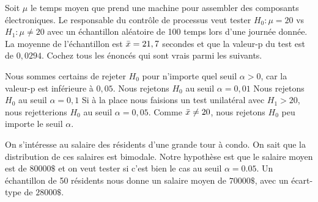 \begin{questions}
\newpage
\question[4]
Soit $\mu$ le temps moyen que prend une machine pour assembler des composants électroniques. Le responsable du contrôle de processus veut tester $H_0:\mu=20$ vs $H_1:\mu\neq 20$ avec un échantillon aléatoire de 100 temps lors d'une journée donnée. La moyenne de l'échantillon est $\Bar{x}=21,7$ secondes et que la valeur-p du test est de $0,0294$. Cochez tous les énoncés qui sont vrais parmi les suivants.
\begin{checkboxes}
\choice Nous sommes certains de rejeter $H_0$ pour n'importe quel seuil $\alpha>0$, car la valeur-p est inférieure à $0,05$.
\choice Nous rejetons $H_0$ au seuil $\alpha=0,01$
\correctchoice Nous rejetons $H_0$ au seuil $\alpha=0,1$
\correctchoice Si à la place nous faisions un test unilatéral avec $H_1>20$, nous rejetterions $H_0$ au seuil $\alpha=0,05$.
\choice Comme $\Bar{x}\neq20$, nous rejetons $H_0$ peu importe le seuil $\alpha$.
\end{checkboxes}

\vspace{0.5cm}

\question
On s'intéresse au salaire des résidents d'une grande tour à condo. On sait que la distribution de ces salaires est bimodale. Notre hypothèse est que le salaire moyen est de $80 000\$$ et on veut tester si c'est bien le cas au seuil $\alpha = 0.05$. Un échantillon de 50 résidents nous donne un salaire moyen de $70 000\$$, avec un écart-type de $28 000\$$. 
\end{questions}
